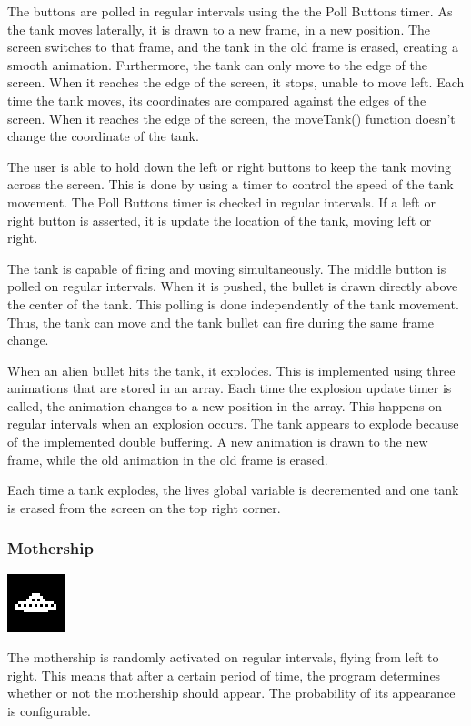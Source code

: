\documentclass[11pt,letter,oneside]{report}
\begin{document}
The buttons are polled in regular intervals using the the Poll Buttons timer. As the tank moves laterally, it is drawn to a new frame, in a new position. The screen switches to that frame, and the tank in the old frame is erased, creating a smooth animation. Furthermore, the tank can only move to the edge of the screen. When it reaches the edge of the screen, it stops, unable to move left. Each time the tank moves, its coordinates are compared against the edges of the screen. When it reaches the edge of the screen, the moveTank() function doesn't change the coordinate of the tank.

The user is able to hold down the left or right buttons to keep the tank moving across the screen. This is done by using a timer to control the speed of the tank movement. The Poll Buttons timer is checked in regular intervals. If a left or right button is asserted, it is update the location of the tank, moving left or right.

The tank is capable of firing and moving simultaneously. The middle button is polled on regular intervals. When it is pushed, the bullet is drawn directly above the center of the tank. This polling is done independently of the tank movement. Thus, the tank can move and the tank bullet can fire during the same frame change.

When an alien bullet hits the tank, it explodes. This is implemented using three animations that are stored in an array. Each time the explosion update timer is called, the animation changes to a new position in the array. This happens on regular intervals when an explosion occurs. The tank appears to explode because of the implemented double buffering. A new animation is drawn to the new frame, while the old animation in the old frame is erased.

Each time a tank explodes, the lives global variable is decremented and one tank is erased from the screen on the top right corner.

\subsubsection{Mothership}
\includegraphics[]{big-alien.png}

The mothership is randomly activated on regular intervals, flying from left to right. This means that after a certain period of time, the program determines whether or not the mothership should appear. The probability of its appearance is configurable.
\end{document}
